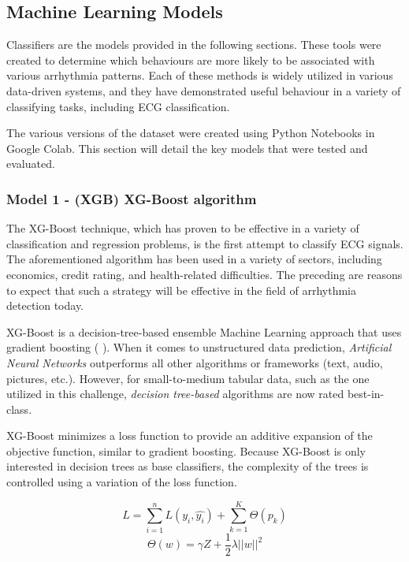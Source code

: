 \subsection{Machine Learning Models} \label{3mlmodels}

Classifiers are the models provided in the following sections. These tools were created to determine which behaviours are more likely to be associated with various arrhythmia patterns. Each of these methods is widely utilized in various data-driven systems, and they have demonstrated useful behaviour in a variety of classifying tasks, including ECG classification.

The various versions of the dataset were created using Python Notebooks in Google Colab. This section will detail the key models that were tested and evaluated.

\subsubsection{Model 1 - (XGB) XG-Boost algorithm} \label{3model1}

The XG-Boost technique, which has proven to be effective in a variety of classification and regression problems, is the first attempt to classify ECG signals. The aforementioned algorithm has been used in a variety of sectors, including economics, credit rating, and health-related difficulties. The preceding are reasons to expect that such a strategy will be effective in the field of arrhythmia detection today.

XG-Boost is a decision-tree-based ensemble Machine Learning approach that uses gradient boosting (\cite{xgb1} \cite{xgb2}). When it comes to unstructured data prediction, \textit{Artificial Neural Networks} outperforms all other algorithms or frameworks (text, audio, pictures, etc.). However, for small-to-medium tabular data, such as the one utilized in this challenge, \textit{decision tree-based} algorithms are now rated best-in-class.

XG-Boost minimizes a loss function to provide an additive expansion of the objective function, similar to gradient boosting. Because XG-Boost is only interested in decision trees as base classifiers, the complexity of the trees is controlled using a variation of the loss function.

\begin{equation}
L = \sum_{i=1}^{n}{L(y_i,\hat{y_i})}+\sum_{k=1}^{K}{\Theta(p_k)}
\end{equation}
\begin{equation}
\Theta(w)=\gamma Z+\frac{1}{2} \lambda ||w||^2
\end{equation}

